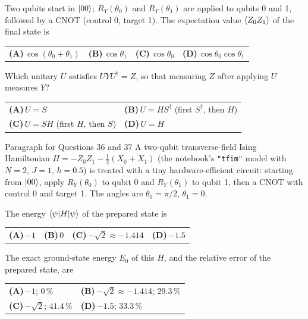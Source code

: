 \documentclass[11pt,a4paper]{article}
\newcommand{\optlabel}[1]{\textbf{(#1)}}
\newenvironment{qitem}[1]{\begin{list}{}{\setlength{\leftmargin}{3.3em}\setlength{\labelwidth}{3.1em}%
  \setlength{\labelsep}{0.2em}\setlength{\topsep}{3pt}\setlength{\parsep}{3pt}}\item[\textbf{Q.#1}\hfill]}{\end{list}}
\newcommand{\qsep}{\par\vspace{2pt}{\color{black!15}\hrule}\vspace{4pt}}
\begin{document}
\begin{qitem}{34}
Two qubits start in $\ket{00}$; $R_Y(\theta_0)$ and $R_Y(\theta_1)$ are applied to qubits 0 and 1, followed by a CNOT (control 0, target 1). The
expectation value $\braket{Z_0Z_1}$ of the final state is
\par\smallskip\noindent\begin{tabularx}{\linewidth}{@{}*{4}{L}@{}}
\optlabel{A}\,$\cos(\theta_0 + \theta_1)$ & \optlabel{B}\,$\cos\theta_1$ & \optlabel{C}\,$\cos\theta_0$ & \optlabel{D}\,$\cos\theta_0\cos\theta_1$
\end{tabularx}
\end{qitem}
\qsep

\begin{qitem}{35}
Which unitary $U$ satisfies $UYU^\dagger = Z$, so that measuring $Z$ after applying $U$ measures $Y$?
\par\smallskip\noindent\begin{tabularx}{\linewidth}{@{}*{2}{L}@{}}
\optlabel{A}\,$U = S$ & \optlabel{B}\,$U = HS^\dagger$ (first $S^\dagger$, then $H$) \\[3pt]
\optlabel{C}\,$U = SH$ (first $H$, then $S$) & \optlabel{D}\,$U = H$
\end{tabularx}
\end{qitem}
\qsep

\begin{passagebox}{Paragraph for Questions 36 and 37}
A two-qubit transverse-field Ising Hamiltonian $H = -Z_0Z_1 - \tfrac12(X_0 + X_1)$ (the notebook's \texttt{"tfim"} model with $N = 2$,
$J = 1$, $h = 0.5$) is treated with a tiny hardware-efficient circuit: starting from $\ket{00}$, apply $R_Y(\theta_0)$ to qubit 0 and $R_Y(\theta_1)$
to qubit 1, then a CNOT with control 0 and target 1. The angles are $\theta_0 = \pi/2$, $\theta_1 = 0$.
\end{passagebox}
\begin{qitem}{36}
The energy $\braket{\psi|H|\psi}$ of the prepared state is
\par\smallskip\noindent\begin{tabularx}{\linewidth}{@{}*{4}{L}@{}}
\optlabel{A}\,$-1$ & \optlabel{B}\,$0$ & \optlabel{C}\,$-\sqrt2 \approx -1.414$ & \optlabel{D}\,$-1.5$
\end{tabularx}
\end{qitem}
\qsep

\begin{qitem}{37}
The exact ground-state energy $E_0$ of this $H$, and the relative error of the prepared state, are
\par\smallskip\noindent\begin{tabularx}{\linewidth}{@{}*{2}{L}@{}}
\optlabel{A}\,$-1$; $0\,\%$ & \optlabel{B}\,$-\sqrt2 \approx -1.414$; $29.3\,\%$ \\[3pt]
\optlabel{C}\,$-\sqrt2$; $41.4\,\%$ & \optlabel{D}\,$-1.5$; $33.3\,\%$
\end{tabularx}
\end{qitem}
\qsep
\end{document}
